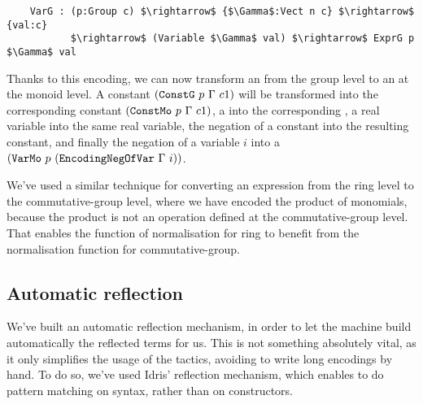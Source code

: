 \begin{lstlisting}
    VarG : (p:Group c) $\rightarrow$ {$\Gamma$:Vect n c} $\rightarrow$ {val:c} 
           $\rightarrow$ (Variable $\Gamma$ val) $\rightarrow$ ExprG p $\Gamma$ val
\end{lstlisting}


Thanks to this encoding, we can now transform an  from the group level to an  at the monoid level. A constant $({\mbox{\texttt{ConstG}}}\ p\ \Gamma\ c1)$ will be transformed into the corresponding constant $({\mbox{\texttt{ConstMo}}}\ p\ \Gamma\ c1)$, a  into the corresponding , a real variable into the same real variable, the negation of a constant into the resulting constant, and finally the negation of a variable $i$ into a $(\code{VarMo}\ p\ (\code{EncodingNegOfVar}\ \Gamma\ i))$.

We've used a similar technique for converting an expression from the ring level to the commutative-group level, where we have encoded the product of monomials, because the product is not an operation defined at the commutative-group level. That enables the function of normalisation for ring to benefit from the normalisation function for commutative-group.


\subsection{Automatic reflection}
		
We've built an automatic reflection mechanism, in order to let the machine build automatically the reflected terms for us. This is not something absolutely vital, as it only simplifies the usage of the tactics, avoiding to write long encodings by hand. To do so, we've used Idris' reflection mechanism, which enables to do pattern matching on syntax, rather than on constructors. 




